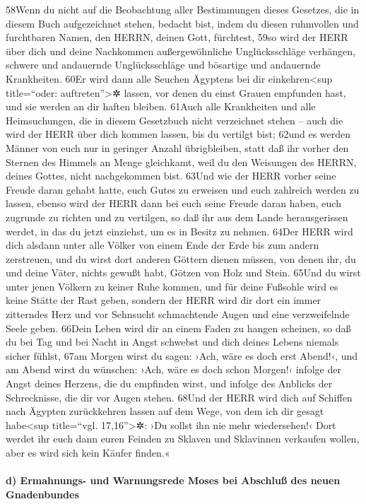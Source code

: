 58Wenn du nicht auf die Beobachtung aller Bestimmungen dieses Gesetzes,
die in diesem Buch aufgezeichnet stehen, bedacht bist, indem du diesen
ruhmvollen und furchtbaren Namen, den HERRN, deinen Gott, fürchtest,
59so wird der HERR über dich und deine Nachkommen außergewöhnliche
Unglücksschläge verhängen, schwere und andauernde Unglücksschläge und
bösartige und andauernde Krankheiten. 60Er wird dann alle Seuchen
Ägyptens bei dir einkehren\textless sup title=``oder:
auftreten''\textgreater✲ lassen, vor denen du einst Grauen empfunden
hast, und sie werden an dir haften bleiben. 61Auch alle Krankheiten und
alle Heimsuchungen, die in diesem Gesetzbuch nicht verzeichnet stehen --
auch die wird der HERR über dich kommen lassen, bis du vertilgt bist;
62und es werden Männer von euch nur in geringer Anzahl übrigbleiben,
statt daß ihr vorher den Sternen des Himmels an Menge gleichkamt, weil
du den Weisungen des HERRN, deines Gottes, nicht nachgekommen bist.
63Und wie der HERR vorher seine Freude daran gehabt hatte, euch Gutes zu
erweisen und euch zahlreich werden zu lassen, ebenso wird der HERR dann
bei euch seine Freude daran haben, euch zugrunde zu richten und zu
vertilgen, so daß ihr aus dem Lande herausgerissen werdet, in das du
jetzt einziehst, um es in Besitz zu nehmen. 64Der HERR wird dich alsdann
unter alle Völker von einem Ende der Erde bis zum andern zerstreuen, und
du wirst dort anderen Göttern dienen müssen, von denen ihr, du und deine
Väter, nichts gewußt habt, Götzen von Holz und Stein. 65Und du wirst
unter jenen Völkern zu keiner Ruhe kommen, und für deine Fußsohle wird
es keine Stätte der Rast geben, sondern der HERR wird dir dort ein immer
zitterndes Herz und vor Sehnsucht schmachtende Augen und eine
verzweifelnde Seele geben. 66Dein Leben wird dir an einem Faden zu
hangen scheinen, so daß du bei Tag und bei Nacht in Angst schwebst und
dich deines Lebens niemals sicher fühlst, 67am Morgen wirst du sagen:
›Ach, wäre es doch erst Abend!‹, und am Abend wirst du wünschen: ›Ach,
wäre es doch schon Morgen!‹ infolge der Angst deines Herzens, die du
empfinden wirst, und infolge des Anblicks der Schrecknisse, die dir vor
Augen stehen. 68Und der HERR wird dich auf Schiffen nach Ägypten
zurückkehren lassen auf dem Wege, von dem ich dir gesagt
habe\textless sup title=``vgl. 17,16''\textgreater✲: ›Du sollst ihn nie
mehr wiedersehen!‹ Dort werdet ihr euch dann euren Feinden zu Sklaven
und Sklavinnen verkaufen wollen, aber es wird sich kein Käufer finden.«

\hypertarget{d-ermahnungs--und-warnungsrede-moses-bei-abschluuxdf-des-neuen-gnadenbundes}{%
\paragraph{d) Ermahnungs- und Warnungsrede Moses bei Abschluß des neuen
Gnadenbundes}\label{d-ermahnungs--und-warnungsrede-moses-bei-abschluuxdf-des-neuen-gnadenbundes}}

